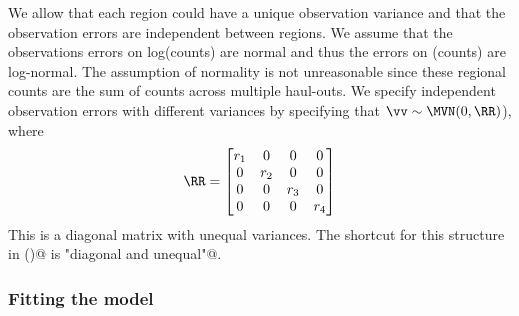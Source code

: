 We allow that each region could have a unique observation variance and that the observation errors are independent between regions.  We assume that the observations errors on log(counts) are normal and thus the errors on (counts) are log-normal. The assumption of normality is not unreasonable since these regional counts are the sum of counts across multiple haul-outs.  We specify independent observation errors with different variances by specifying  that $\vv \sim \MVN(0,\RR)$), where
\begin{equation}
\RR = \begin{bmatrix}
    r_1 & 0 & 0 & 0 \\
    0 & r_2 & 0 & 0\\
    0 & 0 & r_3 & 0 \\
    0 & 0 & 0 & r_4 \end{bmatrix}
\end{equation}
This is a diagonal matrix with unequal variances.  The shortcut for this structure in \verb@MARSS()@ is \verb@"diagonal and unequal"@.

\subsubsection{Fitting the model}

